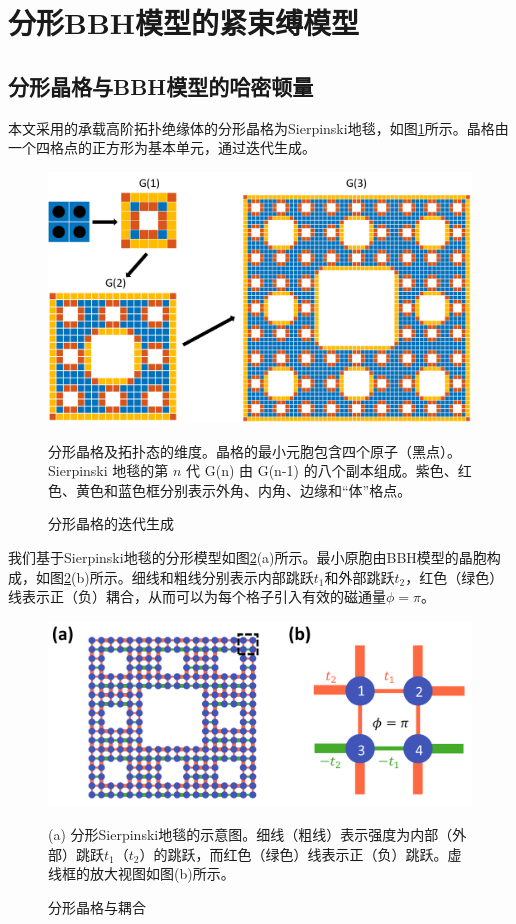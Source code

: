 \section{分形BBH模型的紧束缚模型}
\subsection{分形晶格与BBH模型的哈密顿量}
本文采用的承载高阶拓扑绝缘体的分形晶格为Sierpinski地毯，如图\ref{fig:Generation}所示。晶格由一个四格点的正方形为基本单元，通过迭代生成。
\begin{figure}[htbp]
    \centering
    \includegraphics[width=0.75\linewidth]{figure/HOTITheo/Generation.png}
    \caption{分形晶格的迭代生成}分形晶格及拓扑态的维度。晶格的最小元胞包含四个原子（黑点）。Sierpinski 地毯的第 \( n \) 代 G(n) 由 G(n-1) 的八个副本组成。紫色、红色、黄色和蓝色框分别表示外角、内角、边缘和“体”格点。
    \label{fig:Generation}
\end{figure}

我们基于Sierpinski地毯的分形模型如图\ref{fig:HOTIlattice}(a)所示。最小原胞由BBH模型的晶胞构成，如图\ref{fig:HOTIlattice}(b)所示。细线和粗线分别表示内部跳跃$t_1$和外部跳跃$t_2$，红色（绿色）线表示正（负）耦合，从而可以为每个格子引入有效的磁通量$\phi=\pi$。

\begin{figure}[htbp]
    \centering
    \includegraphics[width=0.5\linewidth]{figure/HOTITheo/HOTIlattice.png}
    \caption{分形晶格与耦合}(a) 分形Sierpinski地毯的示意图。细线（粗线）表示强度为内部（外部）跳跃$t_1$（$t_2$）的跳跃，而红色（绿色）线表示正（负）跳跃。虚线框的放大视图如图(b)所示。
    \label{fig:HOTIlattice}
\end{figure}

